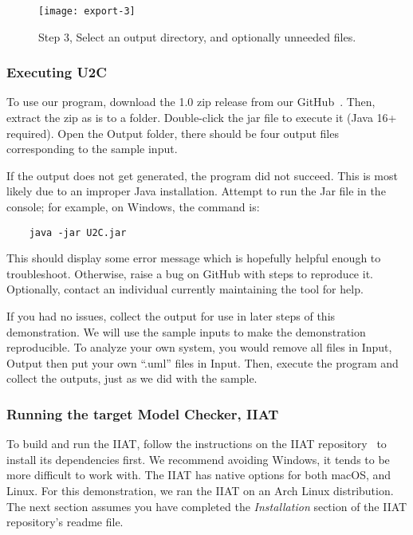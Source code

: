 \begin{figure}[p!]
    \centering
    \texttt{[image: export-3]}
    \caption{Step 3, Select an output directory, and optionally unneeded files.}
    \label{fig:export-3}
\end{figure}
\clearpage %

\subsubsection{Executing U2C}\label{subsubsec:exec}
To use our program, download the 1.0 zip release from our GitHub~\cite{repo_u2c}.
Then, extract the zip as is to a folder.
Double-click the jar file to execute it (Java 16+ required).
Open the Output folder, there should be four output files corresponding to the sample input.

If the output does not get generated, the program did not succeed.
This is most likely due to an improper Java installation.
Attempt to run the Jar file in the console; for example, on Windows, the command is:
\begin{verbatim}
    java -jar U2C.jar
\end{verbatim}
This should display some error message which is hopefully helpful enough to troubleshoot.
Otherwise, raise a bug on GitHub with steps to reproduce it.
Optionally, contact an individual currently maintaining the tool for help.

If you had no issues, collect the output for use in later steps of this demonstration.
We will use the sample inputs to make the demonstration reproducible.
To analyze your own system, you would remove all files in Input, Output then put your own ``.uml'' files in Input.
Then, execute the program and collect the outputs, just as we did with the sample.

\subsubsection{Running the target Model Checker, IIAT}\label{subsubsec:iiat-run}
To build and run the IIAT, follow the instructions on the IIAT repository~\cite{repo_iiat} to install its dependencies first.
We recommend avoiding Windows, it tends to be more difficult to work with.
The IIAT has native options for both macOS, and Linux.
For this demonstration, we ran the IIAT on an Arch Linux distribution.
The next section assumes you have completed the \textit{Installation} section of the IIAT repository's readme file.

